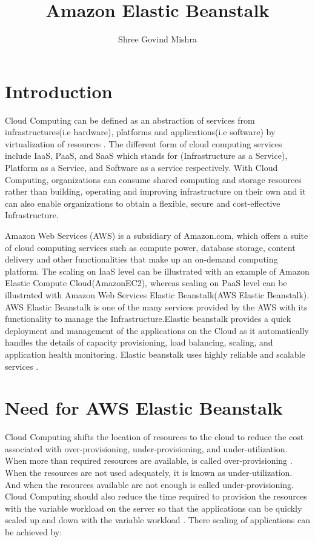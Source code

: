 \documentclass[9pt,twocolumn,twoside]{../../styles/osajnl}
\title{Amazon Elastic Beanstalk}
\author[1]{Shree Govind Mishra}
\affil[1]{School of Informatics and Computing, Bloomington, IN 47408, U.S.A.}
\affil[*]{Corresponding authors: shremish@indiana.edu}
\begin{document}
\maketitle

\section{Introduction}

Cloud Computing can be defined as an abstraction of services from
infrastructures(i.e hardware), platforms and applications(i.e
software) by virtualization of resources \cite{elastic-beanstalk}. The
different form of cloud computing services include IaaS, PaaS, and
SaaS which stands for (Infrastructure as a Service), Platform as a
Service, and Software as a service respectively. With Cloud
Computing, organizations can consume shared computing and storage
resources rather than building, operating and improving infrastructure
on their own and it can also enable organizations to obtain a
flexible, secure and cost-effective Infrastructure.

Amazon Web Services (AWS) is a subsidiary of Amazon.com, which offers
a suite of cloud computing services such as compute power, database
storage, content delivery and other functionalities that make up an
on-demand computing platform. The scaling on IaaS level can be
illustrated with an example of Amazon Elastic Compute
Cloud(AmazonEC2), whereas scaling on PaaS level can be illustrated
with Amazon Web Services Elastic Beanstalk(AWS Elastic Beanstalk). AWS
Elastic Beanstalk is one of the many services provided by the AWS
with its functionality to manage the Infrastructure.Elastic beanstalk
provides a quick deployment and management of the applications on the
Cloud as it automatically handles the details of capacity
provisioning, load balancing, scaling, and application health
monitoring. Elastic beanstalk uses highly reliable and scalable
services \cite{elastic-beanstalk-2}.

\section{Need for AWS Elastic Beanstalk}

Cloud Computing shifts the location of resources to the cloud to
reduce the cost associated with over-provisioning, under-provisioning,
and under-utilization. When more than required resources are
available, is called over-provisioning \cite{cloudcomputing}. When the
resources are not used adequately, it is known as
under-utilization. And when the resources available are not enough is
called under-provisioning. Cloud Computing should also reduce the time
required to provision the resources with the variable workload on the
server so that the applications can be quickly scaled up and down with
the variable workload \cite{elastic-beanstalk-book}. There scaling of
applications can be achieved by:
\end{document}
